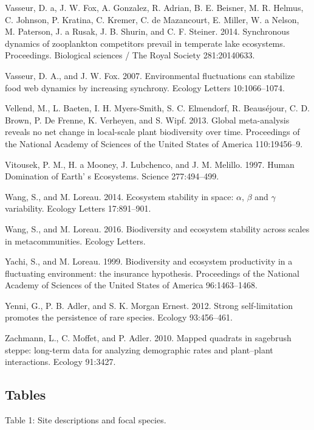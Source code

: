 \documentclass[12pt,]{article}
\begin{document}
Vasseur, D. a, J. W. Fox, A. Gonzalez, R. Adrian, B. E. Beisner, M. R.
Helmus, C. Johnson, P. Kratina, C. Kremer, C. de Mazancourt, E. Miller,
W. a Nelson, M. Paterson, J. a Rusak, J. B. Shurin, and C. F. Steiner.
2014. Synchronous dynamics of zooplankton competitors prevail in
temperate lake ecosystems. Proceedings. Biological sciences / The Royal
Society 281:20140633.

Vasseur, D. A., and J. W. Fox. 2007. Environmental fluctuations can
stabilize food web dynamics by increasing synchrony. Ecology Letters
10:1066--1074.

Vellend, M., L. Baeten, I. H. Myers-Smith, S. C. Elmendorf, R.
Beaus{é}jour, C. D. Brown, P. {De Frenne}, K. Verheyen, and S. Wipf.
2013. Global meta-analysis reveals no net change in local-scale plant
biodiversity over time. Proceedings of the National Academy of Sciences
of the United States of America 110:19456--9.

Vitousek, P. M., H. a Mooney, J. Lubchenco, and J. M. Melillo. 1997.
Human Domination of Earth' s Ecosystems. Science 277:494--499.

Wang, S., and M. Loreau. 2014. Ecosystem stability in space: \(\alpha\),
\(\beta\) and \(\gamma\) variability. Ecology Letters 17:891--901.

Wang, S., and M. Loreau. 2016. Biodiversity and ecosystem stability
across scales in metacommunities. Ecology Letters.

Yachi, S., and M. Loreau. 1999. Biodiversity and ecosystem productivity
in a fluctuating environment: the insurance hypothesis. Proceedings of
the National Academy of Sciences of the United States of America
96:1463--1468.

Yenni, G., P. B. Adler, and S. K. {Morgan Ernest}. 2012. Strong
self-limitation promotes the persistence of rare species. Ecology
93:456--461.

Zachmann, L., C. Moffet, and P. Adler. 2010. Mapped quadrats in
sagebrush steppe: long-term data for analyzing demographic rates and
plant--plant interactions. Ecology 91:3427.

 \newpage{}

\subsection{Tables}\label{tables}

\singlespacing

Table 1: Site descriptions and focal species. \footnotesize
\end{document}
